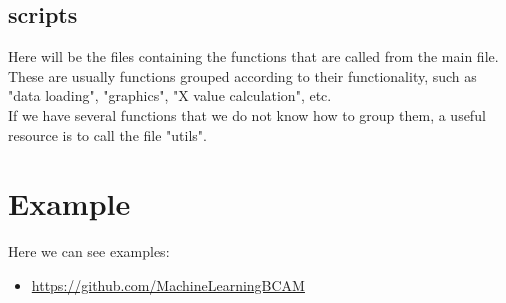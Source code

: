 \documentclass[a4paper]{article}
\begin{document}
		\subsection*{scripts}
			Here will be the files containing the functions that are called from the main file.\\
			These are usually functions grouped according to their functionality, such as "data loading", "graphics", "X value calculation", etc.\\
			If we have several functions that we do not know how to group them, a useful resource is to call the file "utils".\\
	\section{Example}
		Here we can see examples:\\
		\begin{itemize}
			\item \url{https://github.com/MachineLearningBCAM} \\
		\end{itemize} 				
		
\end{document}
